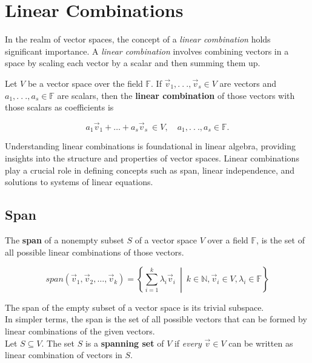 \section{Linear Combinations}

In the realm of vector spaces, the concept of a \emph{linear combination} holds significant importance. A \emph{linear combination} involves combining vectors in a space by scaling each vector by a scalar and then summing them up. 


    Let $V$ be a vector space over the field $\mathbb F$. If $\vec{v}_1, . \ . \ ., \vec v_s \in V$ are vectors and $a_1, . \ . \ ., a_s \in \mathbb F$ are scalars, then the \textbf{linear combination} of those vectors with those scalars as coefficients is 

$$
a_1 \vec v_1 + \dots + a_s \vec v_s \ \in V, \quad a_1, . \ . \ ., a_s \in \mathbb F.
$$

\label{def:linear-combination}

Understanding linear combinations is foundational in linear algebra, providing insights into the structure and properties of vector spaces. Linear combinations play a crucial role in defining concepts such as span, linear independence, and solutions to systems of linear equations.
\subsection{Span}

The \textbf{span} of a nonempty subset $S$ of a vector space $V$ over a field $\mathbb F$, is the set of all possible linear combinations of those vectors.

$$
\textit{span}(\vec{v}_1, \vec{v}_2, \ldots, \vec{v}_k) = \left\{ \sum_{i=1}^k \lambda_i \vec{v}_i \ \middle| \ k \in \mathbb{N}, \vec{v}_i \in V, \lambda_i \in \mathbb F \right\}
$$

The span of the empty subset of a vector space is its trivial subspace.
\\

In simpler terms, the span is the set of all possible vectors that can be formed by linear combinations of the given vectors.
\\

Let $S \subseteq V$. The set $S$ is a \textbf{spanning set} of $V$ if \textit{every} $\vec v \in V$ can be written as linear combination of vectors in $S$.


